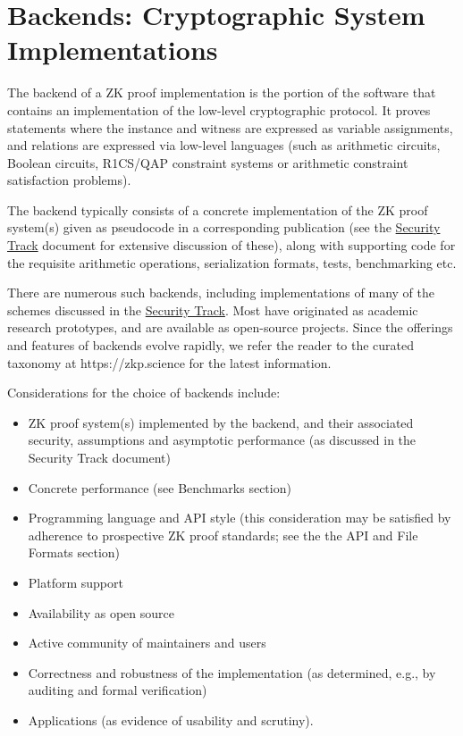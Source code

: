\section{Backends: Cryptographic System Implementations}
\label{implem:backends}

The backend of a ZK proof implementation is the portion of the software that contains an implementation of the low-level cryptographic protocol. It proves statements where the instance and witness are expressed as variable assignments, and relations are expressed via low-level languages (such as arithmetic circuits, Boolean circuits, R1CS/QAP constraint systems or arithmetic constraint satisfaction problems).

The backend typically consists of a concrete implementation of the ZK proof system(s) given as pseudocode in a corresponding publication (see the \hyperref[chap:security]{Security Track} document for extensive discussion of these), along with supporting code for the requisite arithmetic operations, serialization formats, tests, benchmarking etc.

There are numerous such backends, including implementations of many of the schemes discussed in the \hyperref[chap:security]{Security Track}. 
Most have originated as academic research prototypes, and are available as open-source projects. 
Since the offerings and features of backends evolve rapidly, we refer the reader to the curated taxonomy at https://zkp.science for the latest information.

Considerations for the choice of backends include:

\begin{itemize}
\item ZK proof system(s) implemented by the backend, and their associated security, assumptions and asymptotic performance (as discussed in the Security Track document)
\item Concrete performance (see Benchmarks section)
\item Programming language and API style (this consideration may be satisfied by adherence to prospective ZK proof standards; see the the API and File Formats section)
\item Platform support
\item Availability as open source
\item Active community of maintainers and users
\item Correctness and robustness of the implementation (as determined, e.g., by auditing and formal verification)
\item Applications (as evidence of usability and scrutiny).
\end{itemize}

